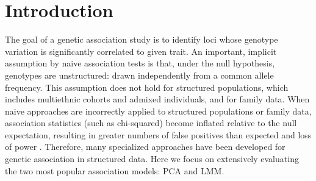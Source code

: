 \documentclass[11pt]{article}
\begin{document}



\section{Introduction} 

The goal of a genetic association study is to identify loci whose genotype variation is significantly correlated to given trait.
An important, implicit assumption by naive association tests is that, under the null hypothesis, genotypes are unstructured: drawn independently from a common allele frequency.
This assumption does not hold for structured populations, which includes multiethnic cohorts and admixed individuals, and for family data.
When naive approaches are incorrectly applied to structured populations or family data, association statistics (such as chi-squared) become inflated relative to the null expectation, resulting in greater numbers of false positives than expected and loss of power \citep{devlin_genomic_1999, voight_confounding_2005, astle_population_2009}.
Therefore, many specialized approaches have been developed for genetic association in structured data.
Here we focus on extensively evaluating the two most popular association models: PCA and LMM.
\end{document}
